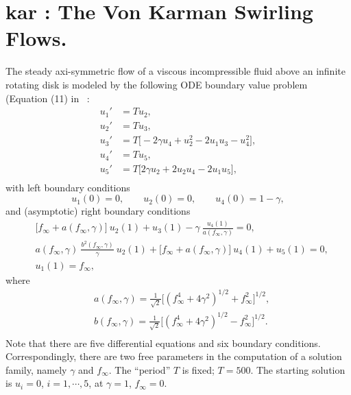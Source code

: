 \documentclass[12pt]{report}
\begin{document}
\newpage
\section{ kar : The Von Karman Swirling Flows.} \label{sec:Demos_kar}
The steady axi-symmetric flow of a viscous incompressible fluid
above an infinite rotating disk is modeled by the following 
ODE boundary value problem (Equation (11) in
 \citeyear{LeKe:80}~:
\begin{equation} \begin{array}{cl}
  u_1' &= T u_2,  \\
  u_2' &= T u_3,  \\
  u_3' &= T \bigl[ -2 \gamma u_4 + u_2^2 - 2 u_1 u_3 - u_4^2 \bigr], \\
  u_4' &= T u_5, \\
  u_5' &= T \bigl[ 2 \gamma u_2 + 2 u_2 u_4 - 2 u_1 u_5 \bigr], \\
\end{array} \end{equation}
with left boundary conditions
$$ u_1(0)=0, \qquad u_2(0)=0, \qquad u_4(0)=1-\gamma, $$
and (asymptotic) right boundary conditions
\begin{equation} \begin{array}{cl}
  & \bigl[ f_\infty + a(f_\infty,\gamma) \bigr] ~ u_2(1) + u_3(1)
  - \gamma ~ \frac{ u_4(1) }{ a(f_\infty,\gamma) } = 0,  \\
  & a(f_\infty,\gamma)~ \frac{ b^2(f_\infty,\gamma) }{ \gamma } ~u_2(1)
  + \bigl[ f_\infty + a(f_\infty,\gamma) \bigr] ~u_4(1) 
  + u_5(1) = 0, \\
 & u_1(1) = f_\infty,
 \end{array} \end{equation}
where
\begin{equation} \begin{array}{cl}
 & a(f_\infty,\gamma) = \frac{1 }{ \sqrt{2} }
  \bigl[ (f_\infty^4 + 4 \gamma^2)^{1/2} + f_\infty^2 \bigr]^{1/2}, \\
 & b(f_\infty,\gamma) = \frac{1 }{ \sqrt{2} }
  \bigl[ (f_\infty^4 + 4 \gamma^2)^{1/2} - f_\infty^2 \bigr]^{1/2}.  \\
\end{array} \end{equation}
Note that there are five differential equations and six boundary conditions.
Correspondingly, there are two free parameters in the computation of a 
solution family, namely $\gamma$ and $f_\infty$.
The ``period'' $T$ is fixed; $T=500$.
The starting solution is $u_i=0$, $i=1,\cdots,5$, 
at $\gamma=1$, $f_\infty=0$.
\end{document}
